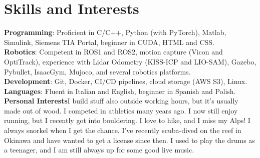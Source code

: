 \documentclass[a4paper,11pt]{article}
\makeatletter
\newcommand{\resumePOR}[3]{
\vspace{0.5mm}\item
    \begin{tabular*}{0.97\textwidth}[t]{l@{\extracolsep{\fill}}r}
        \textbf{#1}\hspace{0.3mm}#2 & \textit{\small{#3}} 
    \end{tabular*}
    \vspace{-2mm}
}
\newcommand{\resumeSubHeadingListStart}{\begin{itemize}[leftmargin=*,labelsep=0mm]}
\newcommand{\resumeItemListStart}{\begin{justify}\begin{itemize}[leftmargin=3ex, rightmargin=2ex, noitemsep,labelsep=1.2mm,itemsep=0mm]\small}
\newcommand{\resumeItemListEnd}{\end{itemize}\end{justify}\vspace{-2mm}}
\makeatother
\begin{document}
\newpage

\section{\textbf{Skills and Interests}}
 \begin{itemize}[leftmargin=0.05in, label={}]
    \small{\item{
     \textbf{Programming}{: Proficient in C/C++, Python (with PyTorch), Matlab, Simulink, Siemens TIA Portal, beginner in CUDA, HTML and CSS.} \\
     \vspace{1.0mm}
     \textbf{Robotics}{: Competent in ROS1 and ROS2, motion capture (Vicon and OptiTrack), experience with Lidar Odometry (KISS-ICP and LIO-SAM), Gazebo, Pybullet, IsaacGym, Mujoco, and several robotics platforms.}\\
     \vspace{1.0mm}
     \textbf{Development}{: Git, Docker, CI/CD pipelines, cloud storage (AWS S3), Linux.} \\
     \vspace{1.0mm}
     \textbf{Languages}{: Fluent in Italian and English, beginner in Spanish and Polish.}\\
     \vspace{1.0mm}
     \textbf{Personal Interests}{I build stuff also outside working hours, but it's usually made out of wood. I competed in athletics many years ago. I now still enjoy running, but I recently got into bouldering. I love to hike, and I miss my Alps! I always snorkel when I get the chance. I've recently scuba-dived on the reef in Okinawa and have wanted to get a license since then. I used to play the drums as a teenager, and I am still always up for some good live music.} \\
    }}
 \end{itemize}
 \vspace{-16pt}



\end{document}

